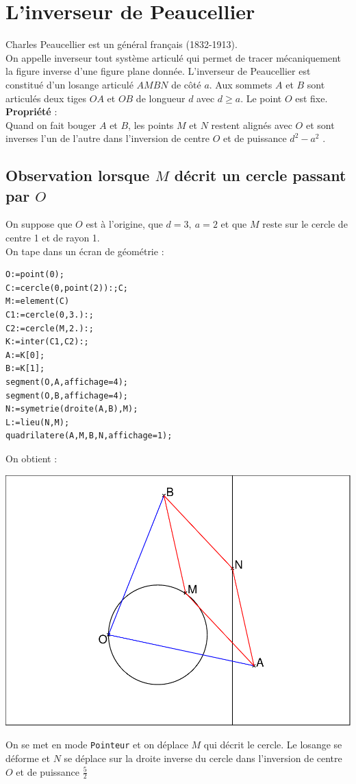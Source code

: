 \documentclass[a4paper,11pt]{book}
\begin{document}
\section{L'inverseur de Peaucellier}
Charles Peaucellier est un g\'en\'eral fran\c{c}ais (1832-1913).\\
On appelle inverseur tout syst\`eme articul\'e qui permet de tracer 
m\'ecaniquement la figure inverse d'une figure plane donn\'ee.
L'inverseur de Peaucellier est constitu\'e d'un losange articul\'e $AMBN$ de 
c\^ot\'e $a$. Aux sommets $A$ et $B$ sont articul\'es deux tiges $OA$ et $OB$ 
de longueur $d$ avec $d\geq a$. Le point $O$ est fixe.\\
{\bf Propri\'et\'e} :\\
Quand on fait bouger $A$ et $B$, les points $M$ et $N$ restent align\'es avec 
$O$ et sont inverses l'un de l'autre dans l'inversion de centre $O$ et de 
puissance $d^2-a^2$ .
\subsection{Observation lorsque $M$ d\'ecrit un cercle passant par $O$}
On suppose que $O$ est \`a l'origine, que $d=3,\ a=2$ et que $M$ reste sur le 
cercle de centre 1 et de rayon 1.\\
On tape dans un \'ecran de g\'eom\'etrie :
\begin{verbatim}
O:=point(0);
C:=cercle(0,point(2)):;C;
M:=element(C)
C1:=cercle(0,3.):;
C2:=cercle(M,2.):;
K:=inter(C1,C2):;
A:=K[0];
B:=K[1];
segment(O,A,affichage=4);
segment(O,B,affichage=4);
N:=symetrie(droite(A,B),M);
L:=lieu(N,M);
quadrilatere(A,M,B,N,affichage=1);
\end{verbatim}
On obtient :
\begin{center}\includegraphics[width=\textwidth]{peauce}\end{center}
On se met en mode {\tt Pointeur} et on d\'eplace $M$ qui d\'ecrit le cercle. 
Le losange se d\'eforme et $N$ se d\'eplace sur la droite inverse du cercle 
dans l'inversion de centre $O$ et de puissance $\displaystyle \frac{5}{2}$
\end{document}
